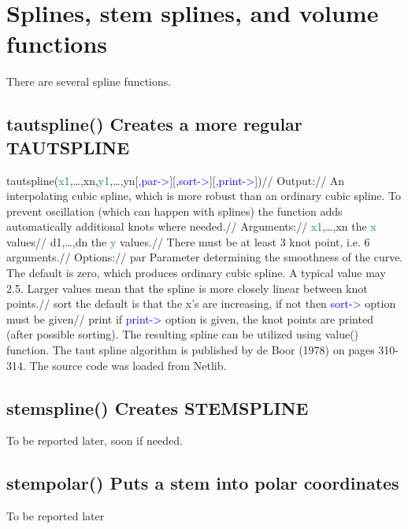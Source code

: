 \section{Splines, stem splines,  and volume functions} 
\label{spline} 
There are several spline functions. 
\subsection{\textcolor{VioletRed}{tautspline}() Creates a more regular TAUTSPLINE} 
\label{tautspline} 
\textcolor{VioletRed}{tautspline}(\textcolor{teal}{x1},…,xn,\textcolor{teal}{y1},…,yn[,\textcolor{blue}{par->}][,\textcolor{blue}{sort->}][,\textcolor{blue}{print->}])// 
Output:// 
An interpolating cubic spline, which is more robust than an ordinary cubic spline. To prevent 
oscillation (which can happen with splines) the function adds automatically additional knots 
where needed.// 
Arguments:// 
\textcolor{teal}{x1},…,xn the \textcolor{teal}{x} values// 
d1,…,dn the \textcolor{teal}{y} values.// 
There must be at least 3 knot point, i.e. 6 arguments.// 
Options:// 
par Parameter determining the smoothness of the curve. The default is zero, 
which produces ordinary cubic spline. A typical value may 2.5. Larger values mean 
that the spline is more closely linear between knot points.// 
sort the default is that the x’s are increasing, if not then \textcolor{blue}{sort->} option must be given// 
print if \textcolor{blue}{print->} option is given, the knot points are printed (after possible sorting). 
The resulting spline can be utilized using \textcolor{VioletRed}{value}() function. 
The taut spline algorithm is published by de Boor (1978) on pages 310-314. The source code 
was loaded from Netlib. 
\subsection{\textcolor{VioletRed}{stemspline}() Creates STEMSPLINE} 
\label{stemspline} 
To be reported later, soon if needed. 
\subsection{\textcolor{VioletRed}{stempolar}() Puts a stem into polar coordinates} 
\label{stempolar} 
To be reported later 

